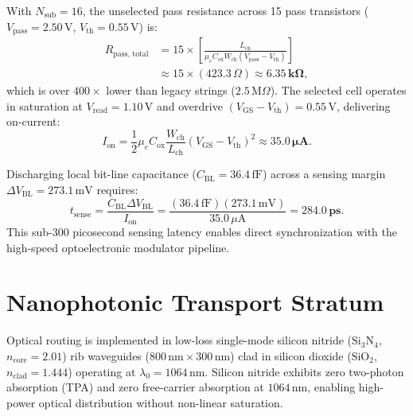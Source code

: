 \documentclass[journal]{IEEEtran}
\begin{document}
With $N_{\text{sub}} = 16$, the unselected pass resistance across 15 pass transistors ($V_{\text{pass}} = 2.50\,\text{V}$, $V_{\text{th}} = 0.55\,\text{V}$) is:
\begin{align}
    R_{\text{pass, total}} &= 15 \times \left[ \frac{L_{\text{ch}}}{\mu_e C_{\text{ox}} W_{\text{ch}} (V_{\text{pass}} - V_{\text{th}})} \right] \nonumber \\
    &\approx 15 \times (423.3\,\Omega) \approx \mathbf{6.35\,\text{k}\Omega},
\end{align}
which is over $400\times$ lower than legacy strings ($2.5\,\text{M}\Omega$). The selected cell operates in saturation at $V_{\text{read}} = 1.10\,\text{V}$ and overdrive $(V_{\text{GS}} - V_{\text{th}}) = 0.55\,\text{V}$, delivering on-current:
\begin{equation}
    I_{\text{on}} = \frac{1}{2} \mu_e C_{\text{ox}} \frac{W_{\text{ch}}}{L_{\text{ch}}} (V_{\text{GS}} - V_{\text{th}})^2 \approx \mathbf{35.0\,\mu\text{A}}.
\end{equation}

Discharging local bit-line capacitance ($C_{\text{BL}} = 36.4\,\text{fF}$) across a sensing margin $\Delta V_{\text{BL}} = 273.1\,\text{mV}$ requires:
\begin{equation}
    t_{\text{sense}} = \frac{C_{\text{BL}} \Delta V_{\text{BL}}}{I_{\text{on}}} = \frac{(36.4\,\text{fF})(273.1\,\text{mV})}{35.0\,\mu\text{A}} = \mathbf{284.0\,\text{ps}}.
\end{equation}
This sub-300 picosecond sensing latency enables direct synchronization with the high-speed optoelectronic modulator pipeline.

\section{Nanophotonic Transport Stratum}
\label{sec:photonics}

Optical routing is implemented in low-loss single-mode silicon nitride ($\text{Si}_3\text{N}_4$, $n_{\text{core}} = 2.01$) rib waveguides ($800\,\text{nm} \times 300\,\text{nm}$) clad in silicon dioxide ($\text{SiO}_2$, $n_{\text{clad}} = 1.444$) operating at $\lambda_0 = 1064\,\text{nm}$. Silicon nitride exhibits zero two-photon absorption (TPA) and zero free-carrier absorption at $1064\,\text{nm}$, enabling high-power optical distribution without non-linear saturation.
\end{document}
